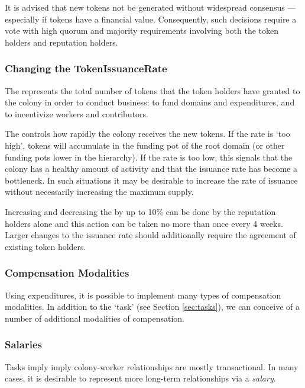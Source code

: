  It is advised that new tokens not be generated without widespread consensus --- especially if tokens have a financial value. Consequently, such decisions require a vote with high quorum and majority requirements involving both the token holders and reputation holders.

\subsubsection*{Changing the TokenIssuanceRate}

The  represents the total number of tokens that the token holders have granted to the colony in order to conduct business: to fund domains and expenditures, and to incentivize workers and contributors.

The  controls how rapidly the colony receives the new tokens. If the rate is `too high', tokens will accumulate in the funding pot of the root domain (or other funding pots lower in the hierarchy). If the rate is too low, this signals that the colony has a healthy amount of activity and that the issuance rate has become a bottleneck. In such situations it may be desirable to increase the rate of issuance without necessarily increasing the maximum supply.

Increasing and decreasing the  by up to 10\% can be done by the reputation holders alone and this action can be taken no more than once every 4 weeks. Larger changes to the issuance rate should additionally require the agreement of existing token holders.

\subsubsection{Compensation Modalities}\label{sec:salary}

Using expenditures, it is possible to implement many types of compensation modalities. In addition to the `task' (see Section \ref{sec:tasks}), we can conceive of a number of additional modalities of compensation.

\subsubsection*{Salaries}

Tasks imply imply colony-worker relationships are mostly transactional. In many cases, it is desirable to represent more long-term relationships via a \emph{salary}.


